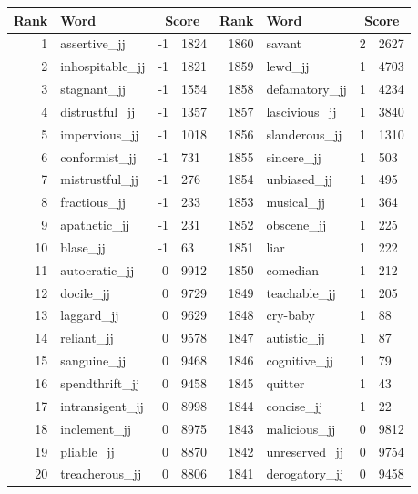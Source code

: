 \begin{table}[tbp]
    \begin{tabular}{| rlr@{.}l | rlr@{.}l |}
    \hline
    \textbf{Rank} & \textbf{Word} & \multicolumn{2}{c|}{\textbf{Score}} & \textbf{Rank} & \textbf{Word} & \multicolumn{2}{c|}{\textbf{Score}} \\
    \hline
    1 & assertive\_jj & -1 & 1824    &    1860 & savant & 2 & 2627 \\
    2 & inhospitable\_jj & -1 & 1821    &    1859 & lewd\_jj & 1 & 4703 \\
    3 & stagnant\_jj & -1 & 1554    &    1858 & defamatory\_jj & 1 & 4234 \\
    4 & distrustful\_jj & -1 & 1357    &    1857 & lascivious\_jj & 1 & 3840 \\
    5 & impervious\_jj & -1 & 1018    &    1856 & slanderous\_jj & 1 & 1310 \\
    6 & conformist\_jj & -1 & 731    &    1855 & sincere\_jj & 1 & 503 \\
    7 & mistrustful\_jj & -1 & 276    &    1854 & unbiased\_jj & 1 & 495 \\
    8 & fractious\_jj & -1 & 233    &    1853 & musical\_jj & 1 & 364 \\
    9 & apathetic\_jj & -1 & 231    &    1852 & obscene\_jj & 1 & 225 \\
    10 & blase\_jj & -1 & 63    &    1851 & liar & 1 & 222 \\
    11 & autocratic\_jj & 0 & 9912    &    1850 & comedian & 1 & 212 \\
    12 & docile\_jj & 0 & 9729    &    1849 & teachable\_jj & 1 & 205 \\
    13 & laggard\_jj & 0 & 9629    &    1848 & cry-baby & 1 & 88 \\
    14 & reliant\_jj & 0 & 9578    &    1847 & autistic\_jj & 1 & 87 \\
    15 & sanguine\_jj & 0 & 9468    &    1846 & cognitive\_jj & 1 & 79 \\
    16 & spendthrift\_jj & 0 & 9458    &    1845 & quitter & 1 & 43 \\
    17 & intransigent\_jj & 0 & 8998    &    1844 & concise\_jj & 1 & 22 \\
    18 & inclement\_jj & 0 & 8975    &    1843 & malicious\_jj & 0 & 9812 \\
    19 & pliable\_jj & 0 & 8870    &    1842 & unreserved\_jj & 0 & 9754 \\
    20 & treacherous\_jj & 0 & 8806    &    1841 & derogatory\_jj & 0 & 9458 \\

\end{tabular}
\end{table}
